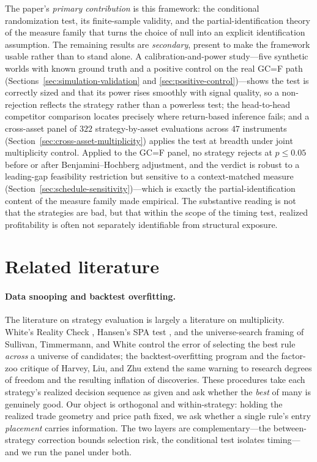 The paper's \emph{primary contribution} is this framework: the conditional randomization
test, its finite-sample validity, and the partial-identification theory of the measure
family that turns the choice of null into an explicit identification assumption. The
remaining results are \emph{secondary}, present to make the framework usable rather than
to stand alone. A calibration-and-power study---five synthetic worlds with known ground
truth and a positive control on the real GC=F path
(Sections~\ref{sec:simulation-validation} and \ref{sec:positive-control})---shows the
test is correctly sized and that its power rises smoothly with signal quality, so a
non-rejection reflects the strategy rather than a powerless test; the head-to-head
competitor comparison locates precisely where return-based inference fails; and a
cross-asset panel of $322$ strategy-by-asset evaluations across $47$ instruments
(Section~\ref{sec:cross-asset-multiplicity}) applies the test at breadth under joint
multiplicity control. Applied to the GC=F panel, no strategy rejects at $p\le0.05$ before
or after Benjamini--Hochberg adjustment, and the verdict is robust to a leading-gap
feasibility restriction but sensitive to a context-matched measure
(Section~\ref{sec:schedule-sensitivity})---which is exactly the partial-identification
content of the measure family made empirical. The substantive reading is not that the
strategies are bad, but that within the scope of the timing test, realized profitability
is often not separately identifiable from structural exposure.

\section{Related literature}

\paragraph{Data snooping and backtest overfitting.} The literature on strategy
evaluation is largely a literature on multiplicity. White's Reality Check
\cite{white2000}, Hansen's SPA test \cite{hansen2005}, and the universe-search framing of
Sullivan, Timmermann, and White \cite{sullivan1999} control the error of selecting the
best rule \emph{across} a universe of candidates; the backtest-overfitting program
\cite{bailey2017,baileylopez2014,lopezdeprado2018} and the factor-zoo critique of
Harvey, Liu, and Zhu \cite{harveyliuzhu2016} extend the same warning to research degrees
of freedom and the resulting inflation of discoveries. These procedures take each
strategy's realized decision sequence as given and ask whether the \emph{best} of many is
genuinely good. Our object is orthogonal and within-strategy: holding the realized trade
geometry and price path fixed, we ask whether a single rule's entry \emph{placement}
carries information. The two layers are complementary---the between-strategy correction
bounds selection risk, the conditional test isolates timing---and we run the panel under
both.

